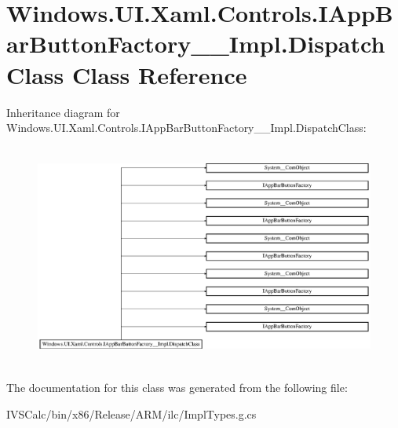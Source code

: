 \hypertarget{class_windows_1_1_u_i_1_1_xaml_1_1_controls_1_1_i_app_bar_button_factory_____impl_1_1_dispatch_class}{}\section{Windows.\+U\+I.\+Xaml.\+Controls.\+I\+App\+Bar\+Button\+Factory\+\_\+\+\_\+\+Impl.\+Dispatch\+Class Class Reference}
\label{class_windows_1_1_u_i_1_1_xaml_1_1_controls_1_1_i_app_bar_button_factory_____impl_1_1_dispatch_class}
Inheritance diagram for Windows.\+U\+I.\+Xaml.\+Controls.\+I\+App\+Bar\+Button\+Factory\+\_\+\+\_\+\+Impl.\+Dispatch\+Class\+:\begin{figure}[H]
\begin{center}
\leavevmode
\includegraphics[height=7.386091cm]{class_windows_1_1_u_i_1_1_xaml_1_1_controls_1_1_i_app_bar_button_factory_____impl_1_1_dispatch_class}
\end{center}
\end{figure}


The documentation for this class was generated from the following file\+:\begin{DoxyCompactItemize}
\item 
I\+V\+S\+Calc/bin/x86/\+Release/\+A\+R\+M/ilc/Impl\+Types.\+g.\+cs\end{DoxyCompactItemize}
